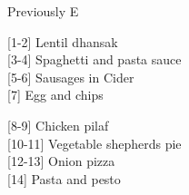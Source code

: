 		\begin{menu}{Previously E}
    
    \begin{recipelist}
    
        {\scriptsize[1-2]} Lentil dhansak\\
        {\scriptsize[3-4]} Spaghetti and pasta sauce\\
        {\scriptsize[5-6]} Sausages in Cider\\
        {\scriptsize[7]} Egg and chips\\%
    \end{recipelist}%
    \begin{recipelist}
    
        {\scriptsize[8-9]} Chicken pilaf\\
        {\scriptsize[10-11]} Vegetable shepherds pie\\
        {\scriptsize[12-13]} Onion pizza\\
        {\scriptsize[14]} Pasta and pesto\\%
    \end{recipelist}\par%
  

\end{menu}
